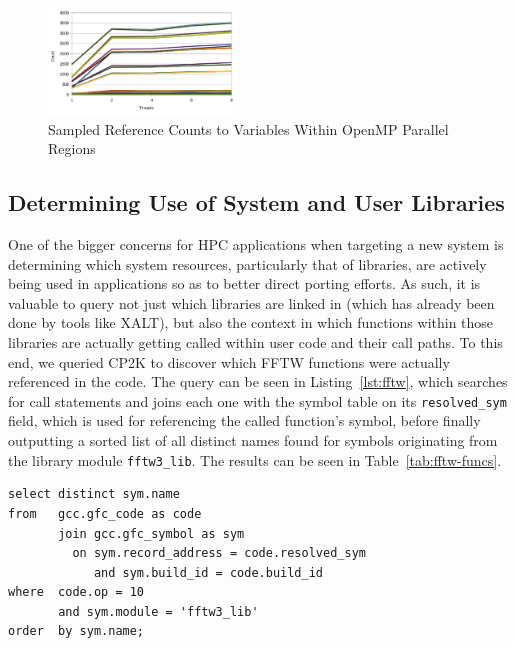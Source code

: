 \begin{figure}
\begin{center}
\includegraphics[width=0.45\textwidth]{images/cp2k-omp-inc-full.pdf}
\end{center}
\caption{Sampled Reference Counts to Variables Within OpenMP Parallel Regions}
\label{fig:openmp-refcount}
\end{figure}

\subsection{Determining Use of System and User Libraries}
One of the bigger concerns for \acs{HPC} applications when targeting a new system is determining 
which system resources, 
particularly that of libraries, are actively being used in applications so as to better direct porting 
efforts.
As such, it is valuable to query not just which libraries are linked in (which has already been done by  
tools like XALT), but also the context in which functions within those libraries are actually getting 
called within user code and their call paths.
To this end, we queried CP2K to discover which \ac{FFTW} functions were actually referenced in the 
code.
The query can be seen in Listing~\ref{lst:fftw}, which searches for call statements and joins each one 
with the symbol table on its \texttt{resolved\_sym} field, which is 
used for referencing the called function's symbol, before finally outputting a sorted list of all distinct 
names found for symbols originating from the library module \texttt{fftw3\_lib}.
The results can be seen in Table~\ref{tab:fftw-funcs}.

\begin{lstlisting}[caption=Querying for Use of Library Functions, label=lst:fftw]
select distinct sym.name
from   gcc.gfc_code as code
       join gcc.gfc_symbol as sym
         on sym.record_address = code.resolved_sym
            and sym.build_id = code.build_id
where  code.op = 10
       and sym.module = 'fftw3_lib'
order  by sym.name;
\end{lstlisting}

